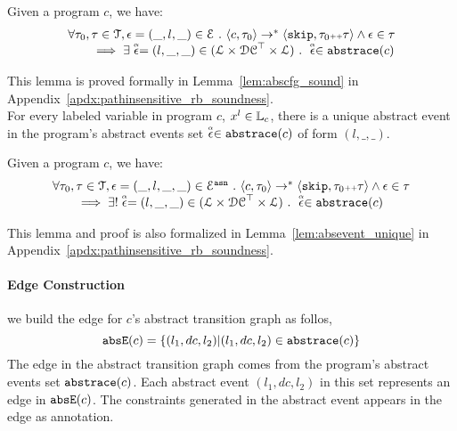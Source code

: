    \begin{lem}
     \label{lem:abscfg_sound}
   Given a program ${c}$, we have:
   \[
     \begin{array}{l}
       \forall \mathtt{\tau}_0, \mathtt{\tau} \in \mathcal{T} ,  \mathtt{\epsilon} = (\_, l, \_) \in \mathcal{E} ~.~
   \langle {c}, \mathtt{\tau}_0 \rangle \to^{*} \langle \mathtt{skip}, \mathtt{\tau}_0 {\scriptscriptstyle ++} \mathtt{\tau} \rangle 
   \land \mathtt{\epsilon} \in \mathtt{\tau} 
   \\
   \qquad \implies \exists \stackrel{\scriptscriptstyle{\alpha}}{\mathtt{\epsilon}{}} = (l, \_, \_) \in (\mathcal{L}\times \mathcal{DC}^{\top} \times \mathcal{L}) ~.~ 
   \stackrel{\scriptscriptstyle{\alpha}}{\mathtt{\epsilon}{}} \in \mathtt{abs}{\mathtt{trace}}(c)
   \end{array}
   \]
   \end{lem}
This lemma is proved formally in Lemma~\ref{lem:abscfg_sound} in Appendix~\ref{apdx:pathinsensitive_rb_soundness}.
\\
For every labeled variable in program $c$, $x^l \in \mathbb{L}_c$, 
there is a unique abstract event in the program's abstract events set $\stackrel{\scriptscriptstyle{\alpha}}{\mathtt{\epsilon}{}} \in \mathtt{abs}{\mathtt{trace}}(c)$ of form $(l, \_, \_)$. 
\begin{lem}
  \label{lem:abscfg_unique}
Given a program ${c}$, we have:
%
\[
  \begin{array}{l}
    \forall \mathtt{\tau}_0, \mathtt{\tau} \in \mathcal{T} ,  \mathtt{\epsilon} = (\_, l, \_, \_) \in \mathcal{E}^{\mathtt{{asn}}} ~.~
\langle {c}, \mathtt{\tau}_0 \rangle \to^{*} \langle \mathtt{skip}, \mathtt{\tau}_0 {\scriptscriptstyle ++} \mathtt{\tau} \rangle 
\land \mathtt{\epsilon} \in \mathtt{\tau} 
\\
\qquad \implies \exists! \stackrel{\scriptscriptstyle{\alpha}}{\mathtt{\epsilon}{}} = (l, \_, \_) \in (\mathcal{L}\times \mathcal{DC}^{\top} \times \mathcal{L}) ~.~ 
\stackrel{\scriptscriptstyle{\alpha}}{\mathtt{\epsilon}{}} \in \mathtt{abs}{\mathtt{trace}}(c)
\end{array}
\]
\end{lem}
This lemma and proof is also 
formalized in Lemma~\ref{lem:absevent_unique} in Appendix~\ref{apdx:pathinsensitive_rb_soundness}.

  \paragraph{Edge Construction}
  we build the edge for $c$'s abstract transition graph as follos,
  \[
    \mathtt{abs}{\mathtt{E}}(c) = \{(l_1, dc, l_2) | (l_1, dc, l_2) \in \mathtt{abs}{\mathtt{trace}}(c)\}
    \]
    The edge in the abstract transition graph comes from the program's abstract events set $\mathtt{abs}{\mathtt{trace}}(c)$.
  Each abstract event $(l_1, dc, l_2)$ in this set represents an edge in $\mathtt{abs}{\mathtt{E}}(c)$.
 The constraints generated in the abstract event appears in the edge as annotation.
%
